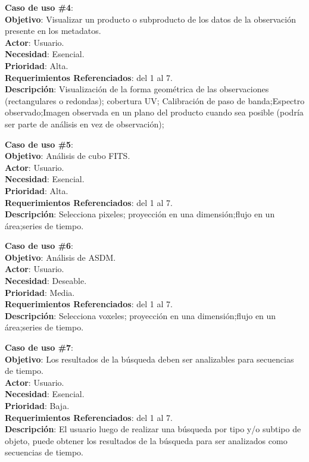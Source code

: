 \noindent\textbf{Caso de uso \#4}: \\
\textbf{Objetivo}: Visualizar un producto o subproducto de los datos de la observación presente en los metadatos. \\
\textbf{Actor}: Usuario. \\
\textbf{Necesidad}: Esencial. \\
\textbf{Prioridad}: Alta. \\
\textbf{Requerimientos Referenciados}: del 1 al 7. \\
\textbf{Descripción}: Visualización de la forma geométrica de las observaciones (rectangulares o redondas); cobertura UV; Calibración de paso de banda;Espectro observado;Imagen observada en un plano del producto cuando sea posible (podría ser parte de análisis en vez de observación);
\vspace{1.0cm}

\noindent\textbf{Caso de uso \#5}: \\
\textbf{Objetivo}: Análisis de cubo FITS. \\
\textbf{Actor}: Usuario.\\
\textbf{Necesidad}: Esencial. \\
\textbf{Prioridad}: Alta. \\
\textbf{Requerimientos Referenciados}: del 1 al 7. \\
\textbf{Descripción}: Selecciona pixeles; proyección en una dimensión;flujo en un área;series de tiempo.
\vspace{1.0cm}

\noindent\textbf{Caso de uso \#6}: \\
\textbf{Objetivo}: Análisis de ASDM. \\
\textbf{Actor}: Usuario. \\
\textbf{Necesidad}: Deseable. \\
\textbf{Prioridad}: Media. \\
\textbf{Requerimientos Referenciados}: del 1 al 7. \\
\textbf{Descripción}: Selecciona voxeles; proyección en una dimensión;flujo en un área;series de tiempo.
\vspace{1.0cm}

\noindent\textbf{Caso de uso \#7}: \\
\textbf{Objetivo}: Los resultados de la búsqueda deben ser analizables para secuencias de tiempo. \\
\textbf{Actor}: Usuario. \\
\textbf{Necesidad}: Esencial. \\
\textbf{Prioridad}: Baja. \\
\textbf{Requerimientos Referenciados}: del 1 al 7. \\
\textbf{Descripción}: El usuario luego de realizar una búsqueda por tipo y/o subtipo de objeto, puede obtener los resultados de la búsqueda para ser analizados como secuencias de tiempo.
\vspace{1.0cm}

